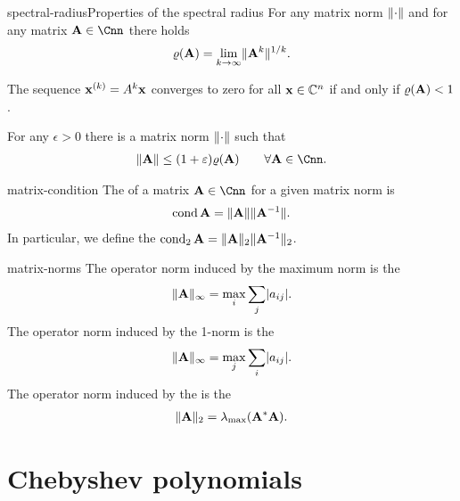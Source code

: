 \begin{Lemma*}{spectral-radius}{Properties of the spectral radius}
  For any matrix norm $\lVert\cdot\rVert$ and for any matrix $\mata\in\Cnn$ there holds
  \begin{gather}
    \varrho(\mathbf A) = \lim_{k\to\infty} \lVert\mathbf A^k\rVert^{1/k}.
  \end{gather}

  The sequence $\mathbf x^{(k)} = A^k\mathbf x$ converges to zero for all
  $\mathbf x\in\mathbb C^n$ if and only if $\varrho(\mathbf A)<1$.

  For any $\epsilon>0$
  there is a matrix norm $\lVert\cdot\rVert$ such that
  \begin{gather}
    \norm{\mata} \le (1+\epsilon) \rho(\mata) \qquad \forall \mata\in\Cnn.
  \end{gather}
\end{Lemma*}

\begin{Definition}{matrix-condition}
  The  of a matrix $\mata\in\Cnn$ for a given
  matrix norm is
  \begin{gather*}
    \operatorname{cond}\mathbf A = \lVert\mathbf A\rVert\lVert\mathbf A^{-1}\rVert.
  \end{gather*}
  In particular, we define the 
 $\operatorname{cond}_2\mathbf A = \lVert\mathbf A\rVert_2\lVert\mathbf A^{-1}\rVert_2$.
\end{Definition}

\begin{Example}{matrix-norms}
  The operator norm induced by the maximum norm is the 
  \begin{gather}
    \lVert\mathbf A\rVert_\infty = \max_i \sum_j \lvert a_{ij}\rvert.
  \end{gather}
  The operator norm induced by the 1-norm is the 
  \begin{gather}
    \lVert\mathbf A\rVert_\infty = \max_j \sum_i \lvert a_{ij}\rvert.
  \end{gather}
  The operator norm induced by the  is the 
  \begin{gather}
    \lVert\mathbf A\rVert_2 = \lambda_{\max}(\mathbf A^*\mathbf A).
  \end{gather}
\end{Example}

\section{Chebyshev polynomials}




\printindex

